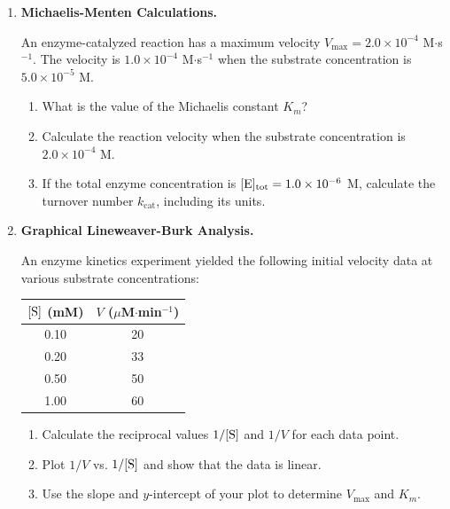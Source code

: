 \documentclass[12pt, a4paper]{book}
\begin{document}
\begin{problembox}
\begin{enumerate}[label=\textbf{P\arabic*.}]
  \item \textbf{Michaelis-Menten Calculations.}
  
        An enzyme-catalyzed reaction has a maximum velocity $V_{\text{max}} = 2.0 \times 10^{-4}$ M$\cdot$s$^{-1}$. The velocity is $1.0 \times 10^{-4}$ M$\cdot$s$^{-1}$ when the substrate concentration is $5.0 \times 10^{-5}$ M.
        \begin{enumerate}[label=(\alph*)]
          \item What is the value of the Michaelis constant $K_m$?
          \item Calculate the reaction velocity when the substrate concentration is $2.0 \times 10^{-4}$ M.
          \item If the total enzyme concentration is $[\ce{E}]_{\text{tot}} = 1.0 \times 10^{-6}$ M, calculate the turnover number $k_{\text{cat}}$, including its units.
        \end{enumerate}

  \item \textbf{Graphical Lineweaver-Burk Analysis.}
  
        An enzyme kinetics experiment yielded the following initial velocity data at various substrate concentrations:
        \begin{center}
        \begin{tabular}{cc}
        \toprule
        \textbf{$[\ce{S}]$ (mM)} & \textbf{$V$ ($\mu$M$\cdot$min$^{-1}$)} \\
        \midrule
        0.10 & 20 \\
        0.20 & 33 \\
        0.50 & 50 \\
        1.00 & 60 \\
        \bottomrule
        \end{tabular}
        \end{center}
        \begin{enumerate}[label=(\alph*)]
          \item Calculate the reciprocal values $1/[\ce{S}]$ and $1/V$ for each data point.
          \item Plot $1/V$ vs. $1/[\ce{S}]$ and show that the data is linear.
          \item Use the slope and $y$-intercept of your plot to determine $V_{\text{max}}$ and $K_m$.
        \end{enumerate}
\end{enumerate}
\end{problembox}
\end{document}
